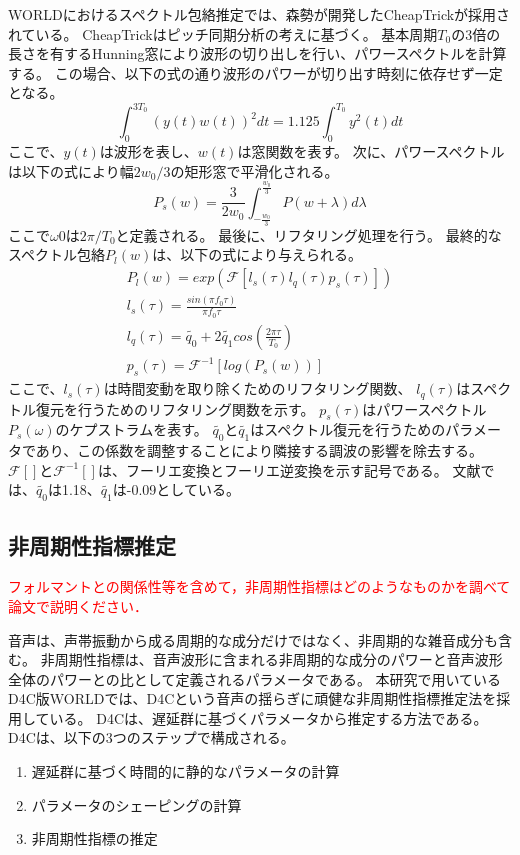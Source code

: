 WORLDにおけるスペクトル包絡推定では、森勢が開発したCheapTrick\cite{morise2015Cheap}が採用されている。
CheapTrickはピッチ同期分析\cite{mathews1961pitch}の考えに基づく。
基本周期$T_0$の3倍の長さを有するHunning窓により波形の切り出しを行い、パワースペクトルを計算する。
この場合、以下の式の通り波形のパワーが切り出す時刻に依存せず一定となる。
\begin{equation}
\int^{3T_0}_{0} (y(t)w(t))^{2}dt = 1.125 \int^{T_0}_{0} y^{2}(t)dt
\end{equation}
ここで、$y(t)$は波形を表し、$w(t)$は窓関数を表す。
次に、パワースペクトルは以下の式により幅${2w_0}/3$の矩形窓で平滑化される。
\begin{equation}
    P_s(w) = \frac{3}{2w_0} \int^{\frac{w_0}3}_{-\frac{w_0}3} P(w+\lambda)d\lambda
\end{equation}
ここで$ω0$は$2π/T_0$と定義される。
最後に、リフタリング処理を行う。
最終的なスペクトル包絡$P_l(w)$は、以下の式により与えられる。
\begin{eqnarray}
    P_l(w) = exp(\mathcal{F}[l_s(\tau)l_q(\tau)p_s(\tau)])  \\
    l_s(\tau) = \frac{sin(πf_0\tau)}{πf_0\tau}  \\
    l_q(\tau) = \tilde{q_0} + 2\tilde{q_1} cos(\frac{2π\tau}{T_0})  \\
    p_s(\tau) = \mathcal{F}^{-1}[log(P_s(w))]
\end{eqnarray}
ここで、$l_s(\tau)$は時間変動を取り除くためのリフタリング関数、
$l_q(\tau)$はスペクトル復元を行うためのリフタリング関数を示す。
$ p_s(\tau)$はパワースペクトル$P_s(ω)$のケプストラムを表す。
$\tilde{q_0}$と$\tilde{q_1}$はスペクトル復元を行うためのパラメータであり、この係数を調整することにより隣接する調波の影響を除去する。
$\mathcal{F}[]$と$\mathcal{F}^{-1}[]$は、フーリエ変換とフーリエ逆変換を示す記号である。
文献\cite{morise2015Cheap}では、$\tilde{q_0}$は1.18、$\tilde{q_1}$は-0.09としている。


\subsection{非周期性指標推定}
\textcolor{red}{フォルマントとの関係性等を含めて，非周期性指標はどのようなものかを調べて論文で説明ください．}

音声は、声帯振動から成る周期的な成分だけではなく、非周期的な雑音成分も含む。
非周期性指標は、音声波形に含まれる非周期的な成分のパワーと音声波形全体のパワーとの比として定義されるパラメータである。
本研究で用いているD4C版WORLDでは、D4C\cite{morise2016worldD4Ce}という音声の揺らぎに頑健な非周期性指標推定法を採用している。
D4Cは、遅延群に基づくパラメータから推定する方法である。
D4Cは、以下の3つのステップで構成される。
\begin{enumerate}
    \item 遅延群に基づく時間的に静的なパラメータの計算
    \item パラメータのシェーピングの計算
    \item 非周期性指標の推定
\end{enumerate}

